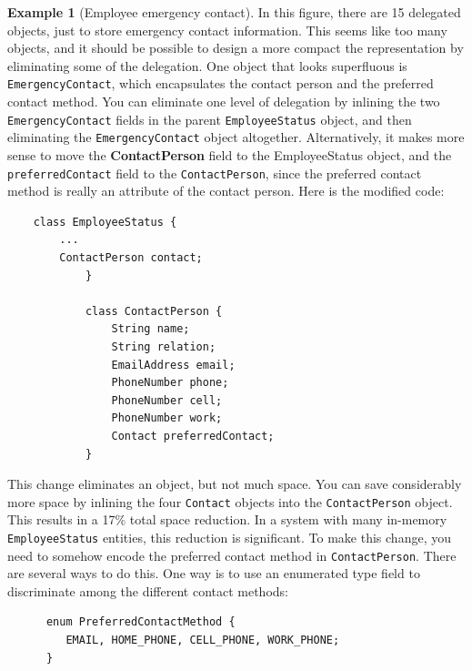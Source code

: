 \documentclass{book}
\theoremstyle{definition}
\newtheorem{example}{Example}
\begin{document}
\begin{example}[Employee emergency contact]
In this figure, there are 15 delegated objects, just to store emergency contact information. This seems like too many objects, and it should be possible to design a more compact the representation by eliminating some of the delegation. One object that looks superfluous is \texttt{EmergencyContact}, which encapsulates the contact person and the preferred contact method. You can eliminate one level of delegation by inlining the two \texttt{EmergencyContact} fields in the parent \texttt{EmployeeStatus} object, and then eliminating the \texttt{EmergencyContact} object altogether. Alternatively, it makes more sense to move the \textbf{ContactPerson} field to the EmployeeStatus object, and the \texttt{preferredContact} field to the \texttt{ContactPerson}, since the preferred contact method is really an attribute of the contact person. Here is the modified code:
\ttfamily
\begin{verbatim}
	class EmployeeStatus {
        ...
        ContactPerson contact;
			}
			
			class ContactPerson {
				String name;
				String relation;
				EmailAddress email;
				PhoneNumber phone;
				PhoneNumber cell;
				PhoneNumber work;
				Contact preferredContact;
			}
\end{verbatim}
\normalfont
This change eliminates an object, but not much space. You can save considerably more space by inlining the four \texttt{Contact} objects into the \texttt{ContactPerson} object. This results in a 17\% total space reduction. In a system with many in-memory \texttt{EmployeeStatus} entities, this reduction is significant. To make this change, you need to somehow encode the preferred contact method in \texttt{ContactPerson}.  There are several ways to do this. One way is to use an enumerated type field to discriminate among the different contact methods:
\ttfamily
\begin{verbatim} 
      enum PreferredContactMethod {
         EMAIL, HOME_PHONE, CELL_PHONE, WORK_PHONE;
      }
      

\end{verbatim}
\end{example}
\end{document}
